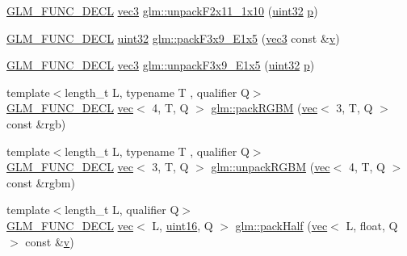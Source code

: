 \begin{DoxyCompactItemize}
\item 
\hyperlink{setup_8hpp_ab2d052de21a70539923e9bcbf6e83a51}{G\+L\+M\+\_\+\+F\+U\+N\+C\+\_\+\+D\+E\+CL} \hyperlink{group__core__types_ga1c47e8b3386109bc992b6c48e91b0be7}{vec3} \hyperlink{group__gtc__packing_ga8b9c7991eb021d95c778bf5c0b2f7824}{glm\+::unpack\+F2x11\+\_\+1x10} (\hyperlink{group__gtc__type__precision_ga202b6a53c105fcb7e531f9b443518451}{uint32} \hyperlink{_s_d_l__opengl__glext_8h_aa5367c14d90f462230c2611b81b41d23}{p})
\item 
\hyperlink{setup_8hpp_ab2d052de21a70539923e9bcbf6e83a51}{G\+L\+M\+\_\+\+F\+U\+N\+C\+\_\+\+D\+E\+CL} \hyperlink{group__gtc__type__precision_ga202b6a53c105fcb7e531f9b443518451}{uint32} \hyperlink{group__gtc__packing_ga0984f9598edc648d59a9643d9a61b121}{glm\+::pack\+F3x9\+\_\+\+E1x5} (\hyperlink{group__core__types_ga1c47e8b3386109bc992b6c48e91b0be7}{vec3} const \&\hyperlink{_s_d_l__opengl_8h_a10a82eabcb59d2fcd74acee063775f90}{v})
\item 
\hyperlink{setup_8hpp_ab2d052de21a70539923e9bcbf6e83a51}{G\+L\+M\+\_\+\+F\+U\+N\+C\+\_\+\+D\+E\+CL} \hyperlink{group__core__types_ga1c47e8b3386109bc992b6c48e91b0be7}{vec3} \hyperlink{group__gtc__packing_ga15d8845a31e1e55d493803d0c8cb5910}{glm\+::unpack\+F3x9\+\_\+\+E1x5} (\hyperlink{group__gtc__type__precision_ga202b6a53c105fcb7e531f9b443518451}{uint32} \hyperlink{_s_d_l__opengl__glext_8h_aa5367c14d90f462230c2611b81b41d23}{p})
\item 
{\footnotesize template$<$length\+\_\+t L, typename T , qualifier Q$>$ }\\\hyperlink{setup_8hpp_ab2d052de21a70539923e9bcbf6e83a51}{G\+L\+M\+\_\+\+F\+U\+N\+C\+\_\+\+D\+E\+CL} \hyperlink{structglm_1_1vec}{vec}$<$ 4, T, Q $>$ \hyperlink{group__gtc__packing_ga0466daf4c90f76cc64b3f105ce727295}{glm\+::pack\+R\+G\+BM} (\hyperlink{structglm_1_1vec}{vec}$<$ 3, T, Q $>$ const \&rgb)
\item 
{\footnotesize template$<$length\+\_\+t L, typename T , qualifier Q$>$ }\\\hyperlink{setup_8hpp_ab2d052de21a70539923e9bcbf6e83a51}{G\+L\+M\+\_\+\+F\+U\+N\+C\+\_\+\+D\+E\+CL} \hyperlink{structglm_1_1vec}{vec}$<$ 3, T, Q $>$ \hyperlink{group__gtc__packing_ga5c1ec97894b05ea21a05aea4f0204a02}{glm\+::unpack\+R\+G\+BM} (\hyperlink{structglm_1_1vec}{vec}$<$ 4, T, Q $>$ const \&rgbm)
\item 
{\footnotesize template$<$length\+\_\+t L, qualifier Q$>$ }\\\hyperlink{setup_8hpp_ab2d052de21a70539923e9bcbf6e83a51}{G\+L\+M\+\_\+\+F\+U\+N\+C\+\_\+\+D\+E\+CL} \hyperlink{structglm_1_1vec}{vec}$<$ L, \hyperlink{group__gtc__type__precision_gad8c2939e1fdd8e5828b31d95c52255d5}{uint16}, Q $>$ \hyperlink{group__gtc__packing_ga2d8bbce673ebc04831c1fb05c47f5251}{glm\+::pack\+Half} (\hyperlink{structglm_1_1vec}{vec}$<$ L, float, Q $>$ const \&\hyperlink{_s_d_l__opengl_8h_a10a82eabcb59d2fcd74acee063775f90}{v})

\end{DoxyCompactItemize}
